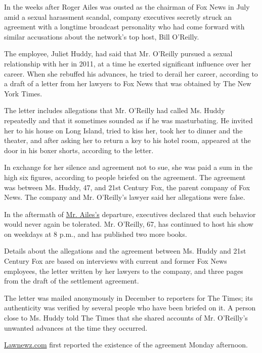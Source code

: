 In the weeks after Roger Ailes was ousted as the chairman of Fox News in
July amid a sexual harassment scandal, company executives secretly
struck an agreement with a longtime broadcast personality who had come
forward with similar accusations about the network's top host, Bill
O'Reilly.

The employee, Juliet Huddy, had said that Mr. O'Reilly pursued a sexual
relationship with her in 2011, at a time he exerted significant
influence over her career. When she rebuffed his advances, he tried to
derail her career, according to a draft of a letter from her lawyers to
Fox News that was obtained by The New York Times.

The letter includes allegations that Mr. O'Reilly had called Ms. Huddy
repeatedly and that it sometimes sounded as if he was masturbating. He
invited her to his house on Long Island, tried to kiss her, took her to
dinner and the theater, and after asking her to return a key to his
hotel room, appeared at the door in his boxer shorts, according to the
letter.

In exchange for her silence and agreement not to sue, she was paid a sum
in the high six figures, according to people briefed on the agreement.
The agreement was between Ms. Huddy, 47, and 21st Century Fox, the
parent company of Fox News. The company and Mr. O'Reilly's lawyer said
her allegations were false.

In the aftermath of
\href{http://www.nytimes3xbfgragh.onion/2016/07/22/business/media/roger-ailes-fox-news.html?_r=0}{Mr.
Ailes's} departure, executives declared that such behavior would never
again be tolerated. Mr. O'Reilly, 67, has continued to host his show on
weekdays at 8 p.m., and has published two more books.

Details about the allegations and the agreement between Ms. Huddy and
21st Century Fox are based on interviews with current and former Fox
News employees, the letter written by her lawyers to the company, and
three pages from the draft of the settlement agreement.

The letter was mailed anonymously in December to reporters for The
Times; its authenticity was verified by several people who have been
briefed on it. A person close to Ms. Huddy told The Times that she
shared accounts of Mr. O'Reilly's unwanted advances at the time they
occurred.

\href{http://lawnewz.com/high-profile/exclusive-fox-news-settled-with-fmr-anchor-who-claimed-bill-oreilly-and-fox-president-sexually-harassed-her/}{Lawnewz.com}
first reported the existence of the agreement Monday afternoon.

